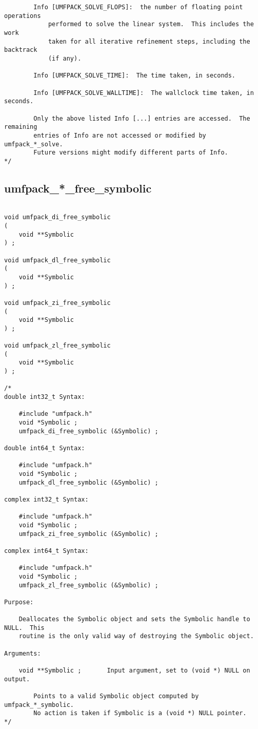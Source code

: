 \documentclass[11pt]{article}
\begin{document}
{\begin{verbatim}
        Info [UMFPACK_SOLVE_FLOPS]:  the number of floating point operations
            performed to solve the linear system.  This includes the work
            taken for all iterative refinement steps, including the backtrack
            (if any).

        Info [UMFPACK_SOLVE_TIME]:  The time taken, in seconds.

        Info [UMFPACK_SOLVE_WALLTIME]:  The wallclock time taken, in seconds.

        Only the above listed Info [...] entries are accessed.  The remaining
        entries of Info are not accessed or modified by umfpack_*_solve.
        Future versions might modify different parts of Info.
*/
\end{verbatim}
}

\newpage
\subsection{umfpack\_*\_free\_symbolic}

{\footnotesize
\begin{verbatim}

void umfpack_di_free_symbolic
(
    void **Symbolic
) ;

void umfpack_dl_free_symbolic
(
    void **Symbolic
) ;

void umfpack_zi_free_symbolic
(
    void **Symbolic
) ;

void umfpack_zl_free_symbolic
(
    void **Symbolic
) ;

/*
double int32_t Syntax:

    #include "umfpack.h"
    void *Symbolic ;
    umfpack_di_free_symbolic (&Symbolic) ;

double int64_t Syntax:

    #include "umfpack.h"
    void *Symbolic ;
    umfpack_dl_free_symbolic (&Symbolic) ;

complex int32_t Syntax:

    #include "umfpack.h"
    void *Symbolic ;
    umfpack_zi_free_symbolic (&Symbolic) ;

complex int64_t Syntax:

    #include "umfpack.h"
    void *Symbolic ;
    umfpack_zl_free_symbolic (&Symbolic) ;

Purpose:

    Deallocates the Symbolic object and sets the Symbolic handle to NULL.  This
    routine is the only valid way of destroying the Symbolic object.

Arguments:

    void **Symbolic ;       Input argument, set to (void *) NULL on output.

        Points to a valid Symbolic object computed by umfpack_*_symbolic.
        No action is taken if Symbolic is a (void *) NULL pointer.
*/
\end{verbatim}
}
\end{document}
